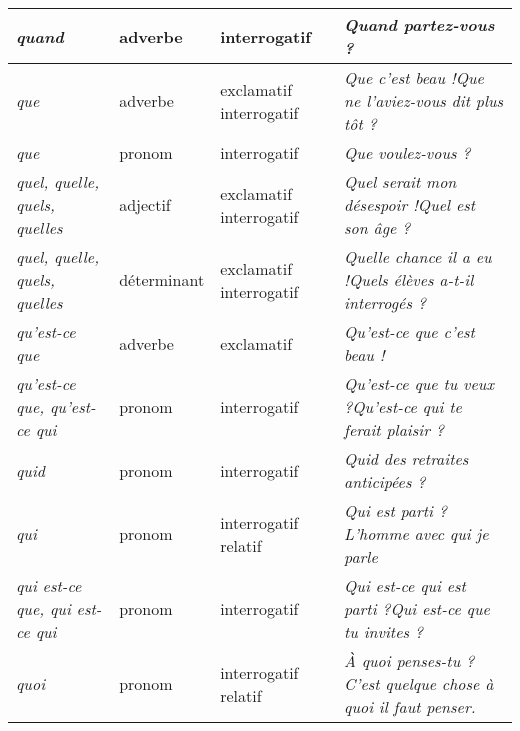 \documentclass[UTF8]{report}
\begin{document}
\begin{table}[H]
\begin{tabular}{|>{\RaggedRight\arraybackslash}p{2.5cm}|l|>{\RaggedRight\arraybackslash}p{2cm}|>{\RaggedRight\arraybackslash}p{6.5cm}|}
\hline
\textit{quand} & adverbe & interrogatif & \textit{Quand partez-vous ?} \\
\hline
\textit{que} & adverbe & exclamatif \newline interrogatif & \textit{Que c'est beau !}\newline\textit{Que ne l'aviez-vous dit plus tôt ?} \\
\hline
\textit{que} & pronom & interrogatif & \textit{Que voulez-vous ?} \\
\hline
\textit{quel, quelle, quels, quelles} & adjectif & exclamatif \newline interrogatif & \textit{Quel serait mon désespoir !}\newline\textit{Quel est son âge ?} \\
\hline
\textit{quel, quelle, quels, quelles} & déterminant & exclamatif \newline interrogatif & \textit{Quelle chance il a eu !}\newline\textit{Quels élèves a-t-il interrogés ?} \\
\hline
\textit{qu'est-ce que} & adverbe & exclamatif & \textit{Qu'est-ce que c'est beau !} \\
\hline
\textit{qu'est-ce que, qu'est-ce qui} & pronom & interrogatif & \textit{Qu'est-ce que tu veux ?}\newline\textit{Qu'est-ce qui te ferait plaisir ?} \\
\hline
\textit{quid} & pronom & interrogatif & \textit{Quid des retraites anticipées ?} \\
\hline
\textit{qui} & pronom & interrogatif \newline relatif & \textit{Qui est parti ?}\newline\textit{L'homme avec qui je parle} \\
\hline
\textit{qui est-ce que, qui est-ce qui} & pronom & interrogatif & \textit{Qui est-ce qui est parti ?}\newline\textit{Qui est-ce que tu invites ?} \\
\hline
\textit{quoi} & pronom & interrogatif \newline relatif & \textit{À quoi penses-tu ?}\newline\textit{C'est quelque chose à quoi il faut penser.} \\
\hline
\end{tabular}
\end{table}
\end{document}
